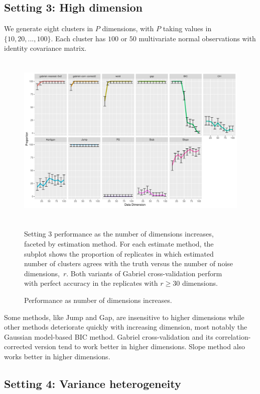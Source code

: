 \documentclass[12pt]{article}
\begin{document}
\subsection{Setting 3: High dimension}

We generate eight clusters in $P$ dimensions, with $P$ taking values in
$\{10,20,...,100\}$.  Each cluster has $100$ or $50$ multivariate
normal observations with identity covariance matrix. 
	
\begin{figure}[H]
\centering
\includegraphics[width=5.5in, height=3.3in]{main_code/demo/bench/setting3/Facet.pdf}
\caption{Setting 3 performance as the number of dimensions increases,
    faceted by estimation method. For each estimate method, the subplot shows the proportion of
    replicates in which estimated number of clusters agrees with the truth
    versus the number of noise dimensions,~$r$. Both variants of Gabriel
    cross-validation perform with perfect accuracy in the replicates
    with $r \geq 30$ dimensions.}

\caption{Performance as number of dimensions increases.}
\label{fig:setting3}
\end{figure}

Some methods, like Jump and Gap, are insensitive to higher dimensions while
other methods deteriorate quickly with increasing dimension, most notably the
Gaussian model-based BIC method.  Gabriel cross-validation and its
correlation-corrected version tend to work better in higher dimensions.
Slope method also works better in higher dimensions.
	

\subsection{Setting 4: Variance heterogeneity}
\end{document}
